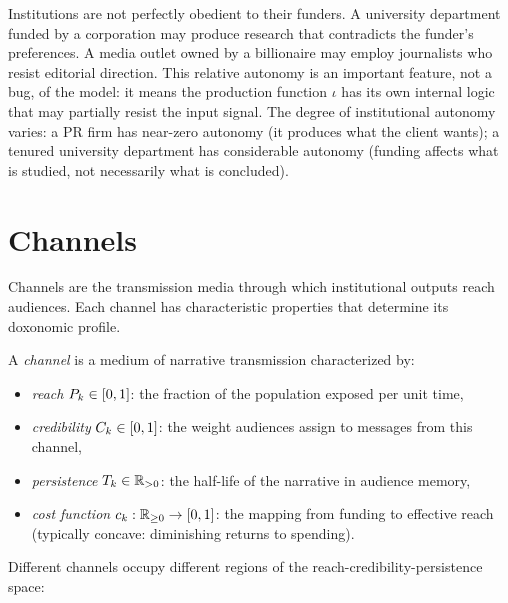 \begin{remark}
\label{rem:autonomy}
Institutions are not perfectly obedient to their funders.
A university department funded by a corporation may produce research that contradicts the funder's preferences.
A media outlet owned by a billionaire may employ journalists who resist editorial direction.
This relative autonomy is an important feature, not a bug, of the model: it means the production function $\iota$ has its own internal logic that may partially resist the input signal.
The degree of institutional autonomy varies: a PR firm has near-zero autonomy (it produces what the client wants); a tenured university department has considerable autonomy (funding affects what is studied, not necessarily what is concluded).
\end{remark}


\section{Channels}
\label{sec:ch4-channels}

Channels are the transmission media through which institutional outputs reach audiences.
Each channel has characteristic properties that determine its doxonomic profile.

\begin{definition}
\label{def:channel}
A \emph{channel} is a medium of narrative transmission characterized by:
\begin{itemize}[nosep]
  \item \emph{reach} $P_{k} \in [0,1]$: the fraction of the population exposed per unit time,
  \item \emph{credibility} $C_{k} \in [0,1]$: the weight audiences assign to messages from this channel,
  \item \emph{persistence} $T_{k} \in \mathbb{R}_{>0}$: the half-life of the narrative in audience memory,
  \item \emph{cost function} $c_k: \mathbb{R}_{\geq 0} \to [0,1]$: the mapping from funding to effective reach (typically concave: diminishing returns to spending).
\end{itemize}
\end{definition}

Different channels occupy different regions of the reach-credibility-persistence space:


